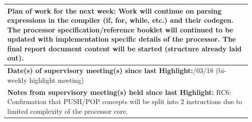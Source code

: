 \documentclass[11pt,a4paper]{article}
\begin{document}
\begin{table}[H]
\begin{tabularx}{\textwidth}{|X|}
	
	
	\textbf{Plan of work for the next week:}\newline
	Work will continue on parsing expressions in the compiler (if, for, while, etc.) and their codegen.
	\newline\newline
	The processor specification/reference booklet will continued to be updated with implementation specific details of the processor.
	\newline\newline
	The final report document content will be started (structure already laid out).
	\\ \hline
	
	
	\textbf{Date(s) of supervisory meeting(s) since last Highlight:}\newline
	12/03/18 (bi-weekly highlight meeting)
	\\ \hline
	
	
	\textbf{Notes from supervisory meeting(s) held since last Highlight:}\newline
	RC6: Confirmation that PUSH/POP concepts will be split into 2 instructions due to limited complexity of the processor core.
	\\ \hline
    \end{tabularx}
\end{table}


\newpage
\end{document}
